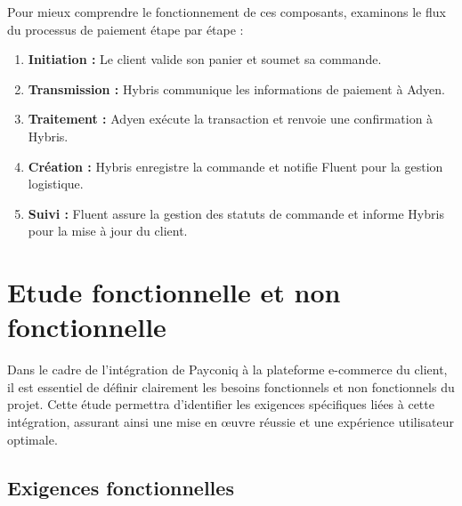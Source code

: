 Pour mieux comprendre le fonctionnement de ces composants, examinons le flux du processus de paiement étape par étape :
\begin{enumerate}
    \item \textbf{Initiation :} Le client valide son panier et soumet sa commande.
    \item \textbf{Transmission :} Hybris communique les informations de paiement à Adyen.
    \item \textbf{Traitement :} Adyen exécute la transaction et renvoie une confirmation à Hybris.
    \item \textbf{Création :} Hybris enregistre la commande et notifie Fluent pour la gestion logistique.
    \item \textbf{Suivi :} Fluent assure la gestion des statuts de commande et informe Hybris pour la mise à jour du client.
\end{enumerate}
\section{Etude fonctionnelle et non fonctionnelle}
Dans le cadre de l'intégration de Payconiq à la plateforme e-commerce du client, il est essentiel de définir clairement les besoins fonctionnels et non fonctionnels du projet. 
Cette étude permettra d'identifier les exigences spécifiques liées à cette intégration, assurant ainsi une mise en œuvre réussie et une expérience utilisateur optimale. 

\subsection{Exigences fonctionnelles}

